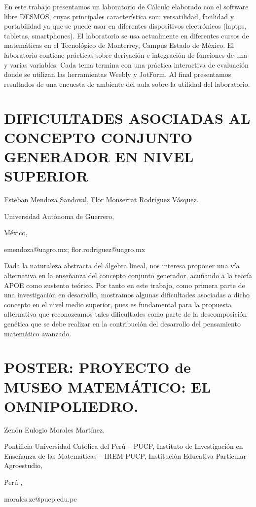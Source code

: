 En este trabajo presentamos un laboratorio de Cálculo elaborado con
el software libre DESMOS, cuyas principales característica son: versatilidad,
facilidad y portabilidad ya que se puede usar en diferentes dispositivos
electrónicos (laptps, tabletas, smartphones). El laboratorio se usa
actualmente en diferentes cursos de matemáticas en el Tecnológico
de Monterrey, Campus Estado de México. El laboratorio contiene prácticas
sobre derivación e integración de funciones de una y varias variables.
Cada tema termina con una práctica interactiva de evaluación donde
se utilizan las herramientas Weebly y JotForm. Al final presentamos
resultados de una encuesta de ambiente del aula sobre la utilidad
del laboratorio. 


\section{DIFICULTADES ASOCIADAS AL CONCEPTO CONJUNTO GENERADOR EN NIVEL SUPERIOR}

\begin{datos}

Esteban Mendoza Sandoval, Flor Monserrat Rodríguez Vásquez.

Universidad Autónoma de Guerrero,

México,

emendoza@uagro.mx; flor.rodriguez@uagro.mx 

\end{datos}

Dada la naturaleza abstracta del álgebra lineal, nos interesa proponer
una vía alternativa en la enseñanza del concepto conjunto generador,
acuñando a la teoría APOE como sustento teórico. Por tanto en este
trabajo, como primera parte de una investigación en desarrollo, mostramos
algunas dificultades asociadas a dicho concepto en el nivel medio
superior, pues es fundamental para la propuesta alternativa que reconozcamos
tales dificultades como parte de la descomposición genética que se
debe realizar en la contribución del desarrollo del pensamiento matemático
avanzado. 


\section{POSTER: PROYECTO de MUSEO MATEMÁTICO: EL OMNIPOLIEDRO. }

\begin{datos}

Zenón Eulogio Morales Martínez.

Pontificia Universidad Católica del Perú – PUCP, Instituto de Investigación
en Enseñanza de las Matemáticas – IREM-PUCP, Institución Educativa
Particular Agroestudio,

Perú ,

morales.ze@pucp.edu.pe 

\end{datos}

